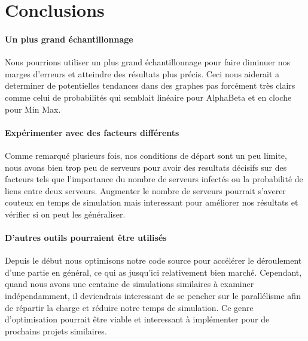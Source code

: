 \documentclass{scrreprt}
\begin{document}
    \section{Conclusions}

    \paragraph{Un plus grand échantillonnage}
    Nous pourrions utiliser un plus grand échantillonnage pour faire diminuer
    nos marges d'erreurs et atteindre des résultats plus précis.
    Ceci nous aiderait a determiner de potentielles tendances dans des
    graphes pas forcément très clairs comme celui de probabilités qui
    semblait linéaire pour AlphaBeta et en cloche pour Min Max.

    \paragraph{Expérimenter avec des facteurs différents}
    Comme remarqué plusieurs fois, nos conditions de départ sont un peu
    limite, nous avons bien trop peu de serveurs pour avoir des resultats
    décisifs sur des facteurs tels que l'importance du nombre de serveurs
    infectés ou la probabilité de liens entre deux serveurs.
    Augmenter le nombre de serveurs pourrait s'averer couteux en temps de
    simulation mais interessant pour améliorer nos résultats et vérifier si on
    peut les généraliser.

    \paragraph{D'autres outils pourraient être utilisés}
    Depuis le début nous optimisons notre code source pour accélérer le
    déroulement d'une partie en général, ce qui as jusqu'ici relativement
    bien marché.
    Cependant, quand nous avons une centaine de simulations similaires à
    examiner indépendamment, il deviendrais interessant de se pencher sur le
    parallélisme afin de répartir la charge et réduire notre temps de
    simulation.
    Ce genre d'optimisation pourrait être viable et interessant à implémenter
    pour de prochains projets similaires.


\end{document}
